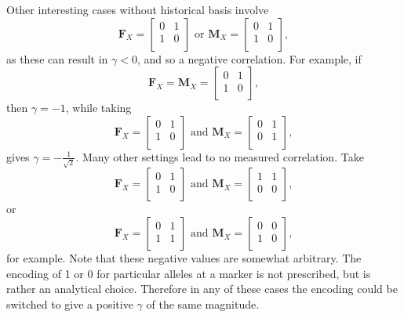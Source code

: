 \documentclass[12pt]{article}
\newcommand{\m}[1]{\mathbf{#1}}               %
\begin{document}
Other interesting cases without historical basis involve
$$\m{F}_X = \begin{bmatrix}
  0 & 1 \\
  1 & 0 \\
\end{bmatrix} \text{ or } \m{M}_X = \begin{bmatrix}
  0 & 1 \\
  1 & 0 \\
\end{bmatrix},$$
as these can result in $\gamma < 0$, and so a negative correlation. For example, if
$$\m{F}_X = \m{M}_X = \begin{bmatrix}
  0 & 1 \\
  1 & 0 \\
\end{bmatrix},$$
then $\gamma = -1$, while taking
$$\m{F}_X = \begin{bmatrix}
  0 & 1 \\
  1 & 0 \\
\end{bmatrix} \text{ and } \m{M}_X = \begin{bmatrix}
  0 & 1 \\
  0 & 1 \\
\end{bmatrix},$$
gives $\gamma = -\frac{1}{\sqrt{2}}$. Many other settings lead to no measured correlation. Take
$$\m{F}_X = \begin{bmatrix}
  0 & 1 \\
  1 & 0 \\
\end{bmatrix} \text{ and } \m{M}_X = \begin{bmatrix}
  1 & 1 \\
  0 & 0 \\
\end{bmatrix},$$
or
$$\m{F}_X = \begin{bmatrix}
  0 & 1 \\
  1 & 1 \\
\end{bmatrix} \text{ and } \m{M}_X = \begin{bmatrix}
  0 & 0 \\
  1 & 0 \\
\end{bmatrix},$$
for example. Note that these negative values are somewhat arbitrary. The encoding of 1 or 0 for particular alleles at a marker is not prescribed, but is rather an analytical choice. Therefore in any of these cases the encoding could be switched to give a positive $\gamma$ of the same magnitude. 
\end{document}
